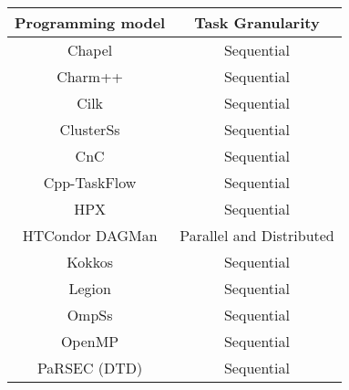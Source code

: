 \begin{tabular}{cc}
\hline
Programming model & Task Granularity \\
\hline
Chapel & Sequential\\
Charm++ & Sequential\\
Cilk & Sequential\\
ClusterSs & Sequential\\
CnC & Sequential\\
Cpp-TaskFlow & Sequential\\
HPX & Sequential\\
HTCondor DAGMan & Parallel and Distributed\\
Kokkos & Sequential\\
Legion & Sequential\\
OmpSs & Sequential\\
OpenMP & Sequential\\
PaRSEC (DTD) & Sequential\\
\hline
\end{tabular}
